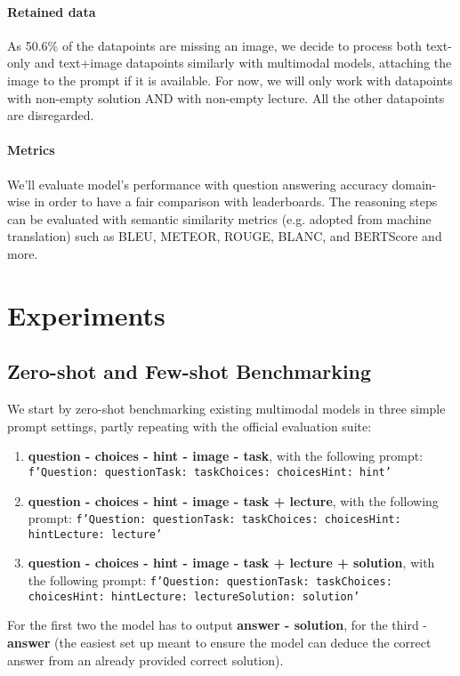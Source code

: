 \documentclass[10pt]{article}
\begin{document}
\paragraph{Retained data} As 50.6\% of the datapoints are missing an image, we decide to process both text-only and text+image datapoints similarly with multimodal models, attaching the image to the prompt if it is available.
For now, we will only work with datapoints with non-empty solution AND with non-empty lecture. All the other datapoints are disregarded.  

\paragraph{Metrics}
We'll evaluate model's performance with question answering accuracy domain-wise in order to have a fair comparison with leaderboards. The reasoning steps can be evaluated with semantic similarity metrics (e.g. adopted from machine translation) such as BLEU, METEOR, ROUGE, BLANC, and BERTScore and more.

\section{Experiments}
\subsection{Zero-shot and Few-shot Benchmarking}
We start by zero-shot benchmarking existing multimodal models in three simple prompt settings, partly repeating with the official evaluation suite:
\begin{enumerate}
	\item \textbf{question - choices - hint - image - task}, with the following prompt:
	\texttt{f'Question: {question}\n Task: {task}\n Choices: {choices}\n Hint: {hint}'}
	\item \textbf{question - choices - hint - image - task + lecture}, with the following prompt:
	\texttt{f'Question: {question}\n Task: {task}\n Choices: {choices}\n Hint: {hint}\n Lecture: {lecture}'}
	\item \textbf{question - choices - hint - image - task + lecture + solution}, with the following prompt:
	\texttt{f'Question: {question}\n Task: {task}\n Choices: {choices}\n Hint: {hint}\n Lecture: {lecture}\n Solution: {solution}'}	
\end{enumerate}

For the first two the model has to output \textbf{answer - solution}, for the third - \textbf{answer} (the easiest set up meant to ensure the model can deduce the correct answer from an already provided correct solution). 
\end{document}
